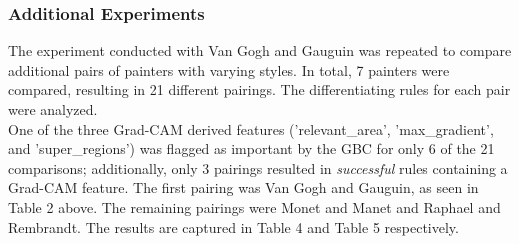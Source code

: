 \documentclass{article}
\begin{document}
\subsubsection{Additional Experiments}
The experiment conducted with Van Gogh and Gauguin was repeated to compare additional pairs of painters with varying styles. In total, 7 painters were compared, resulting in 21 different pairings. The differentiating rules for each pair were analyzed. \\

One of the three Grad-CAM derived features ('relevant\_area', 'max\_gradient', and 'super\_regions') was flagged as important by the GBC for only 6 of the 21 comparisons; additionally, only 3 pairings resulted in \textit{successful} rules containing a Grad-CAM feature. The first pairing was Van Gogh and Gauguin, as seen in Table 2 above. The remaining pairings were Monet and Manet and Raphael and Rembrandt. The results are captured in Table 4 and Table 5 respectively.\\

\begin{table}[h!]
\centering
{}
\caption{Rules for Monet vs. Manet}
\label{tab:my-table}
\end{table}
\end{document}
